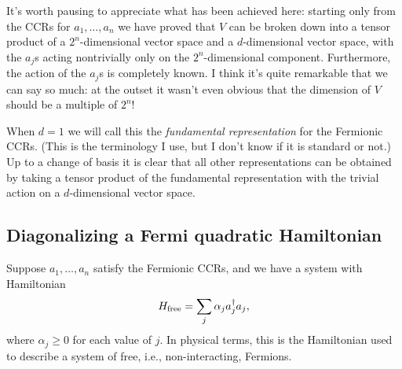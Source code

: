 \documentclass[12pt]{article}
\begin{document}
It's worth pausing to appreciate what has been achieved here: starting
only from the CCRs for $a_1,\ldots,a_n$ we have proved that $V$ can be
broken down into a tensor product of a $2^n$-dimensional vector space
and a $d$-dimensional vector space, with the $a_j$s acting
nontrivially only on the $2^n$-dimensional component. Furthermore, the
action of the $a_j$s is completely known.  I think it's quite
remarkable that we can say so much: at the outset it wasn't even
obvious that the dimension of $V$ should be a multiple of $2^n$!

When $d=1$ we will call this the \emph{fundamental representation} for
the Fermionic CCRs.  (This is the terminology I use, but I don't know
if it is standard or not.)  Up to a change of basis it is clear that
all other representations can be obtained by taking a tensor product
of the fundamental representation with the trivial action on a
$d$-dimensional vector space.




\subsection{Diagonalizing a Fermi quadratic Hamiltonian}

Suppose $a_1,\ldots,a_n$ satisfy the Fermionic CCRs, and we have a
system with Hamiltonian
\begin{eqnarray}
  H_{\rm free} = \sum_j \alpha_j a_j^\dagger a_j,
\end{eqnarray}
where $\alpha_j \geq 0$ for each value of $j$.  In physical terms,
this is the Hamiltonian used to describe a system of free, i.e.,
non-interacting, Fermions.  
\end{document}
